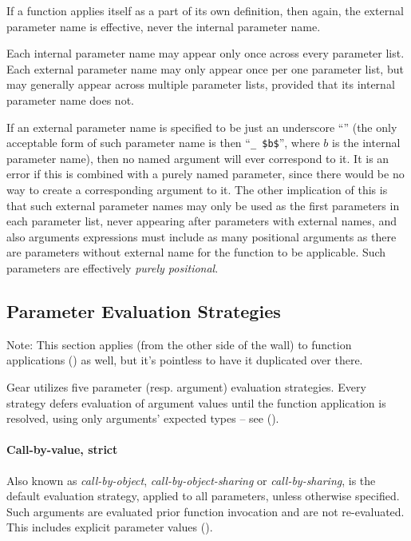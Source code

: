 If a function applies itself as a part of its own definition, then again, the external parameter name is effective, never the internal parameter name. 

Each internal parameter name may appear only once across every parameter list. Each external parameter name may only appear once per one parameter list, but may generally appear across multiple parameter lists, provided that its internal parameter name does not. 

If an external parameter name is specified to be just an underscore ``\code{_}'' (the only acceptable form of such parameter name is then ``\lstinline!_ $b$!'', where $b$ is the internal parameter name), then no named argument will ever correspond to it. It is an error if this is combined with a purely named parameter, since there would be no way to create a corresponding argument to it. The other implication of this is that such external parameter names may only be used as the first parameters in each parameter list, never appearing after parameters with external names, and also arguments expressions must include as many positional arguments as there are parameters without external name for the function to be applicable. Such parameters are effectively {\em purely positional}. 





\subsection{Parameter Evaluation Strategies}
\label{sec:param-eval-strategies}

Note: This section applies (from the other side of the wall) to function applications () as well, but it's pointless to have it duplicated over there. 

Gear utilizes five parameter (resp. argument) evaluation strategies. Every strategy defers evaluation of argument values until the function application is resolved, using only arguments' expected types -- see (). 

\paragraph{Call-by-value, strict}
Also known as {\em call-by-object}, {\em call-by-object-sharing} or {\em call-by-sharing}, is the default evaluation strategy, applied to all parameters, unless otherwise specified. Such arguments are evaluated prior function invocation and are not re-evaluated. This includes explicit parameter values ().

